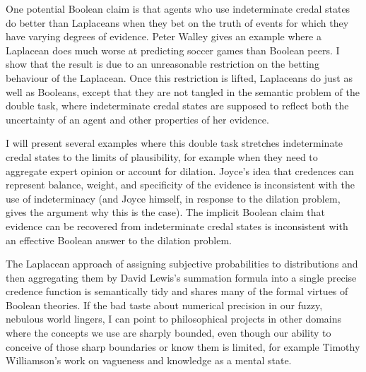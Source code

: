\documentclass[11pt]{article}
\begin{document}
One potential Boolean claim is that agents who use indeterminate
credal states do better than Laplaceans when they bet on the truth of
events for which they have varying degrees of evidence. Peter Walley
gives an example where a Laplacean does much worse at predicting
soccer games than Boolean peers. I show that the result is due to an
unreasonable restriction on the betting behaviour of the Laplacean.
Once this restriction is lifted, Laplaceans do just as well as
Booleans, except that they are not tangled in the semantic problem of
the double task, where indeterminate credal states are supposed to
reflect both the uncertainty of an agent and other properties of her
evidence.

I will present several examples where this double task stretches
indeterminate credal states to the limits of plausibility, for example
when they need to aggregate expert opinion or account for dilation.
Joyce's idea that credences can represent balance, weight, and
specificity of the evidence is inconsistent with the use of
indeterminacy (and Joyce himself, in response to the dilation problem,
gives the argument why this is the case). The implicit Boolean claim
that evidence can be recovered from indeterminate credal states is
inconsistent with an effective Boolean answer to the dilation problem.

The Laplacean approach of assigning subjective probabilities to
distributions and then aggregating them by David Lewis's summation
formula into a single precise credence function is semantically tidy
and shares many of the formal virtues of Boolean theories. If the bad
taste about numerical precision in our fuzzy, nebulous world lingers,
I can point to philosophical projects in other domains where the
concepts we use are sharply bounded, even though our ability to
conceive of those sharp boundaries or know them is limited, for
example Timothy Williamson's work on vagueness and knowledge as a
mental state.
\end{document}
